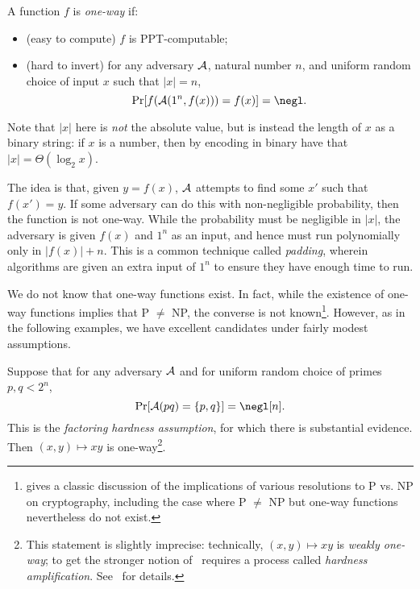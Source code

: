 \begin{dfn}\label{def:one-way function}
  A function $f$ is \emph{one-way} if:
  \begin{itemize}
    \item (easy to compute) $f$ is PPT-computable;
    \item (hard to invert) for any adversary $\mathcal{A}$, natural number $n$, and
      uniform random choice of input $x$ such that $|x| = n$, \[
        \Pr[f(\cA(1^n, f(x))) = f(x)] = \negl.
      \]
  \end{itemize}
  Note that $|x|$ here is \emph{not} the absolute value, but is instead the
  length of $x$ as a binary string: if $x$ is a number, then by encoding in
  binary have that $|x| = \Theta(\log_2 x)$.
\end{dfn}

The idea is that, given $y = f(x)$, $\mathcal{A}$ attempts to find some $x'$ such that
$f(x') = y$. If some adversary can do this with non-negligible probability, then the
function is not one-way. While the probability must be negligible in $|x|$, the
adversary is given $f(x)$ and $1^n$ as an input, and hence must run polynomially
only in $|f(x)| + n$. This is a common technique called \emph{padding}, wherein
algorithms are given an extra input of $1^n$ to ensure they have enough time to
run.

We do not know that one-way functions exist. In fact, while the existence of
one-way functions implies that P $\neq$ NP, the converse is not
known\footnote{\cite{impagliazzo-1995} gives a classic discussion of the
  implications of various resolutions to P vs. NP on cryptography, including the
case where P $\neq$ NP but one-way functions nevertheless do not exist.}.
However, as in the following examples, we have excellent candidates under fairly
modest assumptions.

\begin{ex}
  Suppose that for any adversary $\mathcal{A}$ and for uniform random choice of primes
  $p,q<2^n$, \[
    \Pr[\cA(pq) = \{p, q\}] = \negl[n].
  \] This is the \emph{factoring hardness assumption}, for which there is
  substantial evidence. Then $(x,y)\mapsto xy$ is one-way\footnote{This
    statement is slightly imprecise: technically, $(x,y)\mapsto xy$ is \emph{weakly
    one-way}; to get the stronger notion of~
    requires a process called \emph{hardness
    amplification}. See~\cite[Section 2.4]{pass-shelat-2020}
for details.}.
\end{ex}

